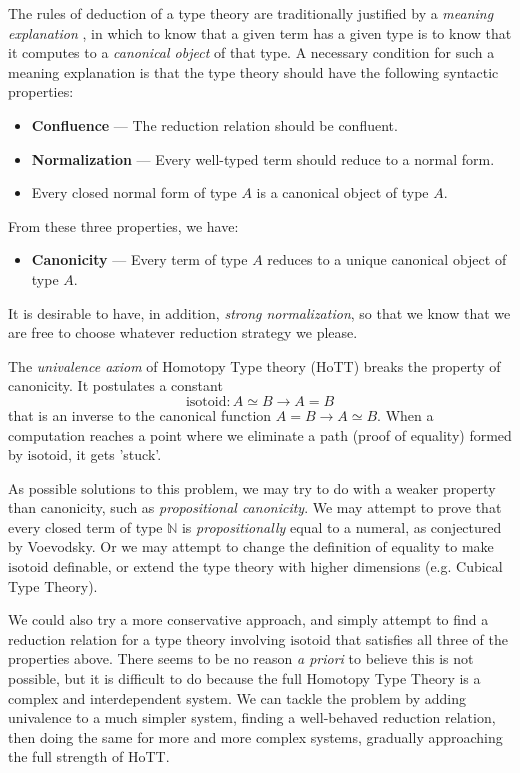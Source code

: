 \documentclass[a4paper,UKenglish]{lipics-v2016}
\newcommand*{\isotoid}{\ensuremath{\mathrm{isotoid}}}
\theoremstyle{plain}
\theoremstyle{definition}
\begin{document}
The rules of deduction of a type theory are traditionally justified by a \emph{meaning explanation} \cite{ML:ITT}, in which to know that a given term has a given type is to know that it computes to a \emph{canonical object} of that type.  A necessary condition for such a meaning explanation is that the type theory should have the following syntactic properties:
\begin{itemize}
\item \textbf{Confluence} --- The reduction relation should be confluent.
\item \textbf{Normalization} --- Every well-typed term should reduce to a normal form.
\item Every closed normal form of type $A$ is a canonical object of type $A$.
\end{itemize}
From these three properties, we have:
\begin{itemize}
\item \textbf{Canonicity} --- Every term of type $A$ reduces to a unique canonical object of type $A$.
\end{itemize}

It is desirable to have, in addition, \emph{strong normalization}, so that we know that we are free to choose whatever reduction strategy we please.

The \emph{univalence axiom} of Homotopy Type theory (HoTT) \cite{hottbook} breaks the property of canonicity.  It postulates a
constant
\[ \isotoid : A \simeq B \rightarrow A = B \]
that is an inverse to the canonical function $A = B \rightarrow A \simeq B$.  When a computation reaches a point
where we eliminate a path (proof of equality) formed by $\isotoid$, it gets 'stuck'.

As possible solutions to this problem, we may try to do with a weaker property than canonicity, such as \emph{propositional canonicity}.
We may attempt to prove that every closed term of type $\mathbb{N}$ is \emph{propositionally} equal to a numeral, as conjectured by Voevodsky.  Or we may attempt to change the definition of equality to make $\isotoid$ definable\cite{Polonsky14a}, or extend the type theory with higher dimensions (e.g. Cubical Type Theory\cite{cchm:cubical}).

We could also try a more conservative approach, and simply attempt to find a reduction relation for a type theory involving $\isotoid$ that satisfies
all three of the properties above.  There seems to be no reason \emph{a priori} to believe this is not possible, but it is difficult to do because
the full Homotopy Type Theory is a complex and interdependent system.  We can tackle the problem by adding univalence to a much simpler system, finding
a well-behaved reduction relation, then doing the same for more and more complex systems, gradually approaching the full strength of HoTT.
\end{document}
